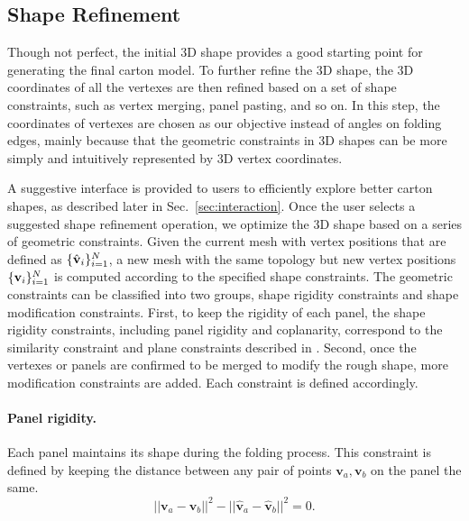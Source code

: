  

\subsection{Shape Refinement}\label{sec:refinement}
 
Though not perfect, the initial 3D shape provides a good starting point for generating the final carton model. 
To further refine the 3D shape, the 3D coordinates of all the vertexes are then refined based on a set of shape constraints, such as vertex merging, panel pasting, and so on.
In this step, the coordinates of vertexes are chosen as our objective instead of angles on folding edges, mainly because that the geometric constraints in 3D shapes can be more simply and intuitively represented by 3D vertex coordinates. 
 
A suggestive interface is provided to users to efficiently explore better carton shapes, as described later in Sec.~\ref{sec:interaction}. 
%
Once the user selects a suggested shape refinement operation, we optimize the 3D shape based on a series of geometric constraints. 
Given the current mesh with vertex positions that are defined as $\{\hat{\mathbf{v}}_i\}^{N}_{i=1}$, a new mesh with the same topology but new vertex positions $\{\mathbf{v}_i\}^{N}_{i=1}$ is computed according to the specified shape constraints.
%
The geometric constraints can be classified into two groups, shape rigidity constraints and shape modification constraints.
% 
First, to keep the rigidity of each panel, the shape rigidity constraints, including panel rigidity and coplanarity, correspond to the similarity constraint and plane constraints described in \cite{Bouaziz:2012:SSD:2346796.2346802}. 
%
Second, once the vertexes or panels are confirmed to be merged to modify the rough shape, more modification constraints are added. 
%
Each constraint is defined accordingly.  
 

\paragraph{Panel rigidity.} 
Each panel maintains its shape during the folding process. This constraint is defined by keeping the distance between any pair of points $\mathbf{v}_{a}, \mathbf{v}_{b}$ on the panel the same.
\begin{equation}
||\mathbf{v}_{a} - \mathbf{v}_{b}||^2 - ||\hat{\mathbf{v}}_{a} - \hat{\mathbf{v}}_{b}||^2 = 0.
\label{equ:plane}
\end{equation}



